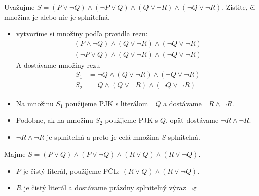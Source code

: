 \begin{priklad}
    Uvažujme $S=(P \lor \neg Q) \land (\neg P \lor Q) \land 
                (Q \lor \neg R) \land (\neg Q \lor \neg R)$.
    Zistite, či množina je alebo nie je splniteľná.

    \begin{itemize}
    \item vytvoríme si množiny podľa pravidla rezu:
        \begin{align*}
            (P\land \neg Q) \land (Q \lor \neg R)  \land 
            (\neg Q \lor \neg R) \\
            (\neg P \lor Q) \land (Q \lor \neg R) \land 
            (\neg Q \lor \neg R)
        \end{align*}
        A dostávame množiny rezu
        \begin{align*}
            S_1 &= \neg Q \land (Q \lor \neg R) \land 
                (\neg Q \lor \neg R)\\
            S_2 &= Q \land (Q \lor \neg R) \land 
                (\neg Q \lor \neg R)
        \end{align*}

    \item Na množinu $S_1$ použijeme PJK s literálom $\neg Q$ a
        dostávame $\neg R \land \neg R$.
    \item Podobne, ak na množinu $S_2$ použijeme PJK s $Q$, opäť
        dostávame $\neg R \land \neg R$.
    \item $\neg R \land \neg R$ je splniteľná a preto je celá
        množina $S$ splniteľná.
    \end{itemize}
\end{priklad}

\begin{priklad}
    Majme $S=(P \lor Q) \land (P \lor \neg Q) \land 
        (R \lor Q) \land (R \lor \neg Q)$. 
    
    \begin{itemize}
    \item $P$ je čistý literál, použijeme PČL:
        $(R \lor Q) \land (R \lor \neg Q)$.
    \item $R$ je čistý literál a dostávame prázdny splniteľný výraz 
        $\neg \varepsilon$
    \end{itemize}
\end{priklad}
